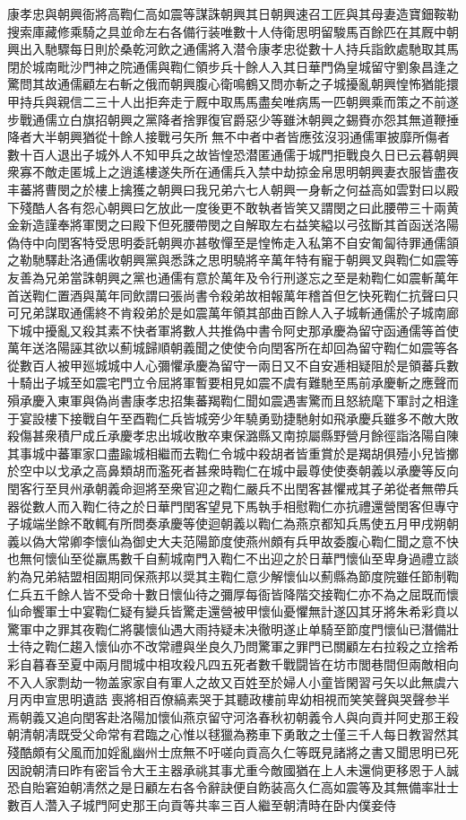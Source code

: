 康孝忠與朝興衙將高鞫仁高如震等謀誅朝興其日朝興速召工匠與其母妻造寶鈿鞍勒搜索庫藏修乘騎之具並命左右各備行装唯數十人侍衛思明留駿馬百餘匹在其厩中朝興出入馳驟每日則於桑乾河飲之通儒將入潜令康孝忠從數十人持兵詣飲處馳取其馬閉於城南毗沙門神之院通儒與鞫仁領步兵十餘人入其日華門偽皇城留守劉象昌逢之驚問其故通儒顧左右斬之俄而朝興腹心衛鳴鶴又問亦斬之子城擾亂朝興惶怖猶能擐甲持兵與親信二三十人出拒奔走亍厩中取馬馬盡矣唯病馬一匹朝興乘而策之不前遂步戰通儒立白旗招朝興之黨降者捨罪復官爵惡少等雖沐朝興之錫賚亦怨其無道鞭捶降者大半朝興猶從十餘人接戰弓矢所無不中者中者皆應弦沒羽通儒軍披靡所傷者數十百人退出子城外人不知甲兵之故皆惶恐潜匿通儒于城門拒戰良久日已云暮朝興衆寡不敵走匿城上之逍遙樓遂失所在通儒兵入禁中劫掠金帛思明朝興妻衣服皆盡夜丰蕃將曹閔之於樓上擒獲之朝興曰我兄弟六七人朝興一身斬之何益高如雲對曰以殿下殘酷人各有怨心朝興曰乞放此一度後更不敢執者皆笑又謂閔之曰此腰帶三十兩黄金新造謹奉將軍閔之曰殿下但死腰帶閔之自解取左右益笑縊以弓弦斷其首函送洛陽偽侍中向閏客特受思明委託朝興亦甚敬憚至是惶怖走入私第不自安匍匐待罪通儒頷之勒馳驛赴洛通儒收朝興黨與悉誅之思明驍將辛萬年特有寵于朝興叉與鞫仁如震等友善為兄弟當誅朝興之黨也通儒有意於萬年及令行刑遂忘之至是勑鞫仁如震斬萬年首送鞫仁置酒與萬年同飲謂曰張尚書令殺弟故相報萬年稽首但乞快死鞫仁抗聲曰只可兄弟謀取通儒終不肯殺弟於是如震萬年領其部曲百餘人入子城斬通儒於子城南廊下城中擾亂又殺其素不快者軍將數人共推偽中書令阿史那承慶為留守函通儒等首使萬年送洛陽誣其欲以薊城歸順朝義聞之使使令向閏客所在却回為留守鞫仁如震等各從數百人被甲廵城城中人心彌懼承慶為留守一兩日又不自安逓相疑阻於是領蕃兵數十騎出子城至如震宅門立令屈將軍暫要相見如震不虞有難馳至馬前承慶斬之應聲而殞承慶入東軍與偽尚書康孝忠招集蕃羯鞫仁聞如震遇害驚而且怒統麾下軍討之相逢于宴設樓下接戰自午至酉鞫仁兵皆城旁少年驍勇勁捷馳射如飛承慶兵雖多不敵大敗殺傷甚衆積尸成丘承慶孝忠出城收散卒東保潞縣又南掠屬縣野營月餘徑詣洛陽自陳其事城中蕃軍家口盡踰城相繼而去鞫仁令城中殺胡者皆重賞於是羯胡俱殪小兒皆擲於空中以戈承之高鼻類胡而濫死者甚衆時鞫仁在城中最尊使使奏朝義以承慶等反向閏客行至貝州承朝義命迴將至衆官迎之鞫仁嚴兵不出閏客甚懼戒其子弟從者無帶兵器從數人而入鞫仁待之於日華門閏客望見下馬執手相慰鞫仁亦抗禮還營閏客但專守子城端坐餘不敢輒有所問奏承慶等使迴朝義以鞫仁為燕京都知兵馬使五月甲戌朔朝義以偽大常卿李懷仙為御史大夫范陽節度使燕州頗有兵甲故委腹心鞫仁聞之意不快也無何懷仙至從羸馬數千自薊城南門入鞫仁不出迎之於日華門懷仙至卑身過禮立談約為兄弟結盟相固期同保燕邦以奨其主鞫仁意少解懷仙以薊縣為節度院雖任節制鞫仁兵五千餘人皆不受命十數日懷仙待之彌厚每衙皆降階交接鞫仁亦不為之屈既而懷仙命饗軍士中宴鞫仁疑有變兵皆驚走還營被甲懷仙憂懼無計遂囚其牙將朱希彩賁以驚軍中之罪其夜鞫仁將襲懷仙遇大雨持疑未决徹明遂止单騎至節度門懷仙已潛備壯士待之鞫仁趨入懷仙亦不改常禮與坐良久乃問驚軍之罪門已關顧左右拉殺之立捨希彩自暮春至夏中兩月間城中相攻殺凡四五死者數千戰闘皆在坊市閭巷間但兩敵相向不入人家剽劫一物盖家家自有軍人之故又百姓至於婦人小童皆閑習弓矢以此無虞六月丙申宣思明遺誥喪將相百僚縞素哭于其聽政樓前卑幼相視而笑笑聲與哭聲参半焉朝義又追向閏客赴洛陽加懷仙燕京留守河洛春秋初朝義令人與向貢并阿史那王殺朝清朝凊既受父命常有君臨之心惟以毬獵為務車下勇敢之士僅三千人每日教習然其殘酷頗有父風而加婬亂幽州士庶無不吁嗟向貢高久仁等既見諸將之書又聞思明已死因說朝清曰昨有密旨令大王主器承祧其事尤重今敵國猶在上人未還倘更移恩于人誠恐自貽窘廹朝凊然之是日顧左右各令辭訣便自飭装高久仁高如震等及其無備率壯士數百人濳入子城門阿史那王向貢等共率三百人繼至朝清時在卧内僕妾侍
